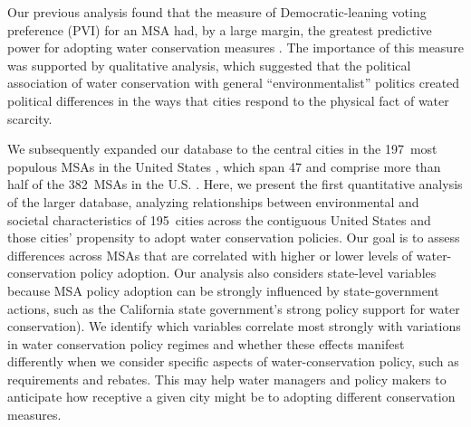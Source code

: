 \documentclass[draft,linenumbers]{agujournal}\usepackage{knitr}
\begin{document}
%
Our previous analysis found that the measure of Democratic-leaning voting preference (PVI)
for an MSA had, by a large margin,
the greatest predictive power for adopting water conservation measures
\citep{hess:drought:2016}.
The importance of this measure
was supported by qualitative analysis, which suggested that the political
association of water conservation with general ``environmentalist'' politics
created political differences in the ways that cities respond to the physical
fact of water scarcity.

We subsequently expanded our database to the central cities in the
197~most populous MSAs in
the United States \citep{hess:vwci:2017},
which span 47  and comprise more than half of the 382~MSAs
in the U.S.
\citep{census:population:2015}. Here, we present the first quantitative
analysis of the larger database, analyzing relationships between environmental
and societal characteristics of 195~cities across the contiguous
United States and those cities' propensity to adopt water conservation policies.
Our goal is to assess differences across MSAs that are correlated with higher or
lower levels of water-conservation policy adoption. Our analysis also
considers state-level
variables because MSA policy adoption can be strongly influenced by state-government actions,
such as the California state government's strong policy support for water conservation).
We identify which variables correlate most strongly with variations in water conservation policy
regimes and whether these
effects manifest differently when we consider specific aspects of
water-conservation policy, such as requirements and rebates.
This may help water managers and policy makers to anticipate how
receptive a given city might be to adopting different conservation measures.
\end{document}
